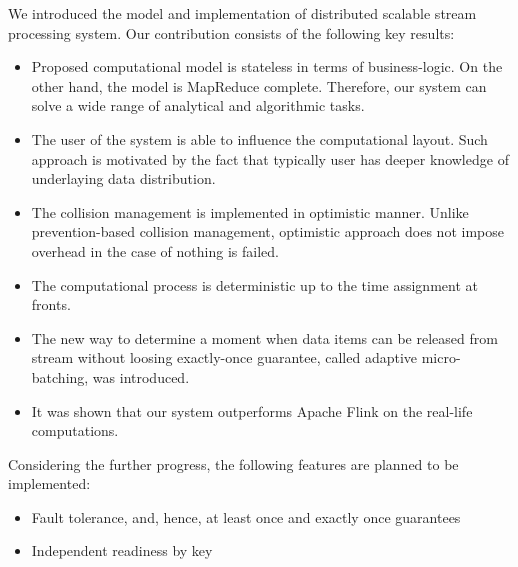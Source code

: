 
\label {fs-conclusion-tection}

We introduced the model and implementation of distributed scalable stream processing system. Our contribution consists of the following key results:

\begin{itemize}
    \item Proposed computational model is stateless in terms of business-logic. On the other hand, the model is MapReduce complete. Therefore, our system can solve a wide range of analytical and algorithmic tasks.
    \item The user of the system is able to influence the computational layout. Such approach is motivated by the fact that typically user has deeper knowledge of underlaying data distribution.
    \item The collision management is implemented in optimistic manner. Unlike prevention-based collision management, optimistic approach does not impose overhead in the case of nothing is failed.
    \item The computational process is deterministic up to the time assignment at fronts.
    \item The new way to determine a moment when data items can be released from stream without loosing exactly-once guarantee, called adaptive micro-batching, was introduced.  
    \item It was shown that our system outperforms Apache Flink on the real-life computations.   
\end{itemize}

Considering the further progress, the following features are planned to be implemented:
\begin{itemize}
    \item Fault tolerance, and, hence, at least once and exactly once guarantees
    \item Independent readiness by key
\end{itemize}









